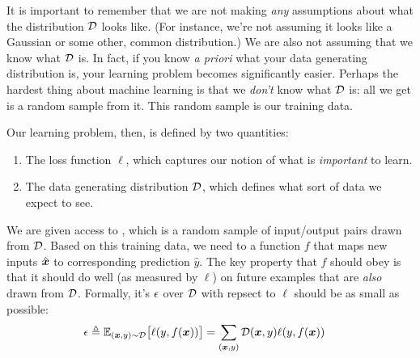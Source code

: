 It is important to remember that we are not making \emph{any}
assumptions about what the distribution $\mathcal{D}$ looks like.  (For
instance, we're not assuming it looks like a Gaussian or some other,
common distribution.)  We are also not assuming that we know what
$\mathcal{D}$ is.  In fact, if you know \emph{a priori} what your data
generating distribution is, your learning problem becomes
significantly easier.  Perhaps the hardest thing about machine
learning is that we \emph{don't} know what $\mathcal{D}$ is: all we get is a
random sample from it.  This random sample is our training data.

Our learning problem, then, is defined by two quantities:

\begin{enumerate}
\item The loss function $\ell$, which captures our notion of what is
  \emph{important} to learn.

\item The data generating distribution $\mathcal{D}$, which defines what sort
  of data we expect to see.
\end{enumerate}

We are given access to , which is a random
sample of input/output pairs drawn from $\mathcal{D}$.  Based on this training
data, we need to  a function $f$ that maps new inputs
$\hat {{\boldsymbol{x}}}$ to corresponding prediction $\hat y$.  The key property
that $f$ should obey is that it should do well (as measured by $\ell$)
on future examples that are \emph{also} drawn from $\mathcal{D}$.  Formally,
it's  $\epsilon$ over $\mathcal{D}$ with repsect to $\ell$
should be as small as possible:
\begin{align} \label{eq:expectederror}
\ep
&\defeq
\Ep_{(\vx,y) \sim \cD} \big[ \ell(y, f(\vx)) \big]
=
\sum_{(\vx,y)} \cD(\vx,y) \ell(y, f(\vx))
\end{align}

